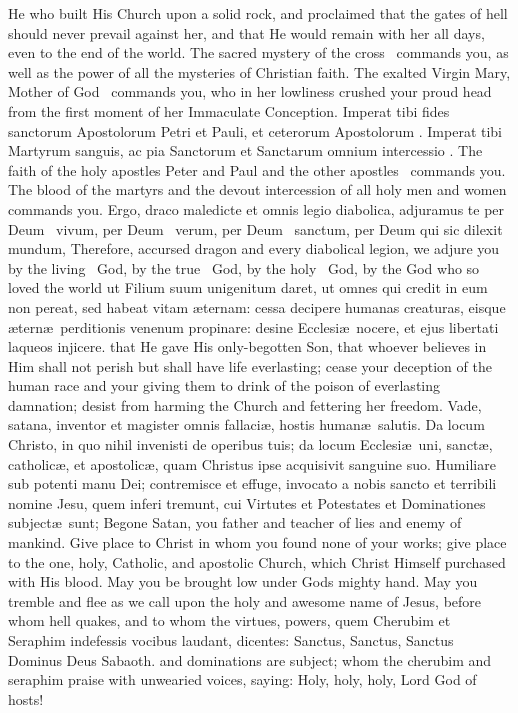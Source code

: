 { He who built His Church upon a solid rock, and proclaimed that the gates of hell should never prevail against her, and that He would remain with her all days, even to the end of the world. The sacred mystery of the cross \grecross~commands you, as well as the power of all the mysteries of Christian faith. The exalted Virgin Mary, Mother of God \grecross~commands you, who in her lowliness crushed your proud head from the first moment of her Immaculate Conception. }
\twoCols
{Imperat tibi fides sanctorum Apostolorum Petri et Pauli, et ceterorum Apostolorum \grecross. Imperat tibi Martyrum sanguis, ac pia Sanctorum et Sanctarum omnium intercessio \grecross.
}{The faith of the holy apostles Peter and Paul and the other apostles \grecross~commands you. The blood of the martyrs and the devout intercession of all holy men and women commands you.
}
\twoCols
{Ergo, draco maledicte et omnis legio diabolica, adjuramus te per Deum \grecross~vivum, per Deum \grecross~verum, per Deum \grecross~sanctum, per Deum qui sic dilexit mundum, }
{Therefore, accursed dragon and every diabolical legion, we adjure you by the living \grecross~God, by the true \grecross~God, by the holy \grecross~God, by the God who so loved the world }
\twoCols
{ut Filium suum unigenitum daret,  ut omnes qui credit in eum non pereat, sed habeat vitam \ae ternam: cessa decipere humanas creaturas, eisque \ae tern\ae\  perditionis venenum propinare: desine Ecclesi\ae \ nocere, et ejus libertati laqueos injicere.
}{that He gave His only-begotten Son, that whoever believes in Him shall not perish but shall have life everlasting; cease your deception of the human race and your giving them to drink of the poison of everlasting damnation; desist from harming the Church and fettering her freedom. 
}
\twoCols
{Vade, satana, inventor et magister omnis fallaci\ae , hostis human\ae \ salutis. Da locum Christo, in quo nihil invenisti de operibus tuis; da locum Ecclesi\ae \ uni, sanct\ae , catholic\ae , et apostolic\ae , quam Christus ipse acquisivit sanguine suo. Humiliare sub potenti manu Dei; contremisce et effuge, invocato a nobis sancto et terribili nomine Jesu, quem inferi tremunt, cui Virtutes et Potestates et Dominationes subject\ae \ sunt;}
{Begone Satan, you father and teacher of lies and enemy of mankind. Give place to Christ in whom you found none of your works; give place to the one, holy, Catholic, and apostolic Church, which Christ Himself purchased with His blood. May you be brought low under Gods mighty hand.  May you tremble and flee as we call upon the holy and awesome name of Jesus, before whom hell quakes, and to whom the virtues, powers,}
\twoCols
{ quem Cherubim et Seraphim indefessis vocibus laudant, dicentes: Sanctus, Sanctus, Sanctus Dominus Deus Sabaoth.}
{ and dominations are subject; whom the cherubim and seraphim praise with unwearied voices, saying: Holy, holy, holy, Lord God of hosts!}

